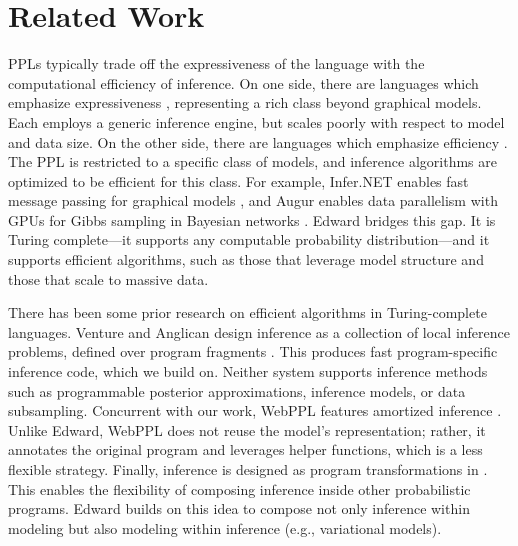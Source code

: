 \section{Related Work}
\label{sub:related}
\vspace{-0.5ex}

\Glspl{PPL} typically trade off the expressiveness of the language
with the computational efficiency of inference.  On one side, there
are languages which emphasize expressiveness
\citep{pfeffer2001ibal,milch2005blog,pfeffer2009figaro,goodman2012church},
representing a rich class beyond graphical models.  Each employs a
generic inference engine, but scales poorly with respect to model and
data size.  On the other side, there are languages which emphasize
efficiency
\citep{spiegelhalter1995bugs,murphy2001bayes,plummer2003jags,salvatier2015probabilistic,carpenter2016stan}.
The \gls{PPL} is restricted to a specific class of models, and
inference algorithms are optimized to be efficient for this class.
For example, Infer.NET enables fast message passing for graphical
models \citep{InferNET14}, and Augur enables data parallelism with
\glspl{GPU} for Gibbs sampling in Bayesian networks
\citep{tristan2014augur}.  Edward bridges this gap.  It is Turing
complete---it supports any computable probability distribution---and
it supports efficient algorithms, such as those that leverage model
structure and those that scale to massive data.

There has been some prior research on efficient algorithms in
Turing-complete languages.  Venture and Anglican design inference as
a collection of local inference problems, defined over program
fragments \citep{mansinghka2014venture,wood2014new}. This produces
fast program-specific inference code, which we build on.
Neither system supports inference methods such as programmable
posterior approximations, inference models, or data subsampling.
Concurrent with our work, WebPPL features amortized inference \citep{ritchie2016deep}.
Unlike Edward, WebPPL does not reuse the model's representation; rather, it annotates the
original program and leverages helper functions, which is a less
flexible strategy.  Finally, inference is designed as program
transformations in
\citet{kiselyov2009embedded,scibior2015practical,zinkov2016composing}.
This enables the flexibility of composing inference inside other
probabilistic programs. Edward builds on this idea to compose not only inference
within modeling but also modeling within inference (e.g.,
variational models).

